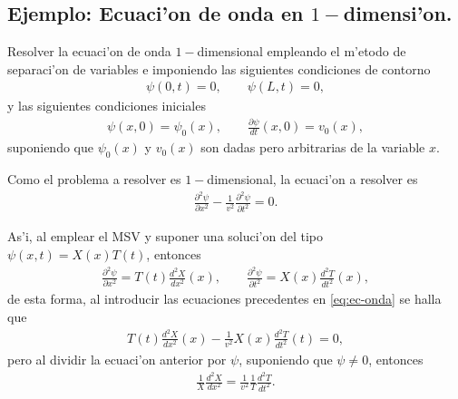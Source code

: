 \subsection{Ejemplo: Ecuaci'on de onda en $1-$dimensi'on.}
Resolver la ecuaci'on de onda $1-$dimensional empleando el m'etodo de separaci'on de variables e imponiendo las siguientes condiciones de contorno 
\begin{align}
\psi(0,t)=0,\qquad \psi(L,t)=0,\label{eq:cond-borde}
\end{align}
y las siguientes condiciones iniciales 
\begin{align}
\psi(x,0)=\psi_{0}(x),\qquad \frac{\partial \psi}{dt}(x,0)=v_{0}(x),\label{eq:cond-inicial}
\end{align}
suponiendo que $\psi_{0}(x)$ y $v_{0}(x)$ son dadas pero arbitrarias de la variable $x$.

Como el problema a resolver es $1-$dimensional, la ecuaci'on a resolver es
\begin{align}
\frac{\partial^2 \psi}{\partial x^2}-\frac{1}{v^2}\frac{\partial^2 \psi}{\partial t^2}=0.\label{eq:ec-onda}
\end{align}

As'i, al emplear el MSV y suponer una soluci'on del tipo $\psi(x,t)=X(x)T(t)$, entonces
\begin{align}
\frac{\partial^2 \psi}{\partial x^2}=T(t) \frac{d^2X}{dx^2}(x),\qquad \frac{\partial^2 \psi}{\partial t^2}=X(x) \frac{d^2 T}{dt^2}(x),
\end{align}
de esta forma, al introducir las ecuaciones precedentes en \eqref{eq:ec-onda} se halla que
\begin{align}
T(t) \frac{d^2X}{dx^2}(x)-\frac{1}{v^2}X(x) \frac{d^2 T}{dt^2}(t)=0,
\end{align}
pero al dividir la ecuaci'on anterior por $\psi$, suponiendo que $\psi \neq 0$, entonces
\begin{align}
\frac{1}{X}\frac{d^2 X}{dx^2}=\frac{1}{v^2}\frac{1}{T}\frac{d^2 T}{dt^2}.\label{eq:ec-separable}
\end{align} 

